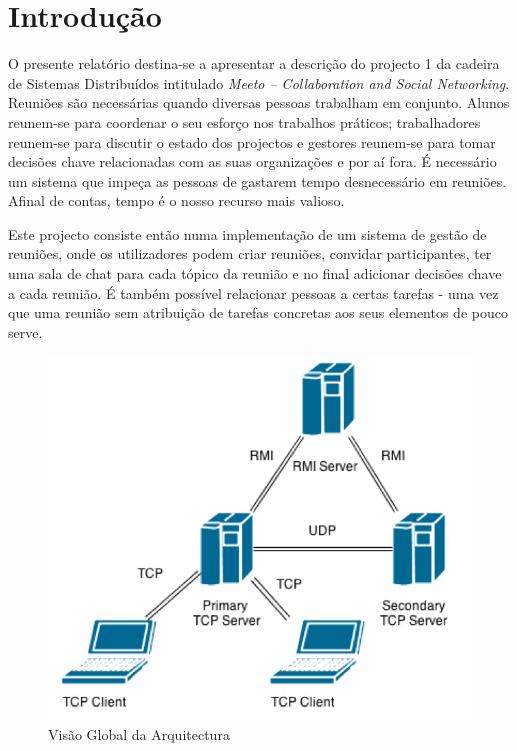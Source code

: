 \documentclass[12pt]{article} %
\begin{document}
\newpage %


\section{Introdução} %
\label{sec:intro}
O presente relatório destina-se a apresentar a descrição do projecto 1 da cadeira de Sistemas Distribuídos intitulado \emph{Meeto – Collaboration and Social Networking}.\\

Reuniões são necessárias quando diversas pessoas trabalham em conjunto. Alunos reunem-se para coordenar o seu esforço nos trabalhos práticos; trabalhadores reunem-se para discutir o estado dos projectos e gestores reunem-se para tomar decisões chave relacionadas com as suas organizações e por aí fora. É necessário um sistema que impeça as pessoas de gastarem tempo desnecessário em reuniões. Afinal de contas, tempo é o nosso recurso mais valioso.

Este projecto consiste então numa implementação de um sistema de gestão de reuniões, onde os utilizadores podem criar reuniões, convidar participantes, ter uma sala de chat para cada tópico da reunião e no final adicionar decisões chave a cada reunião. É também possível relacionar pessoas a certas tarefas - uma vez que uma reunião sem atribuição de tarefas concretas aos seus elementos de pouco serve.

\begin{figure}[!ht]
  	\centering
  	\includegraphics[scale=0.5]{figure1.png}
  	\caption{Visão Global da Arquitectura}
	\label{figure1}
\end{figure}
\end{document}
